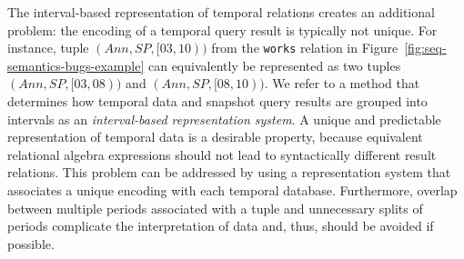 The interval-based representation of temporal relations creates an
additional problem: the encoding of a temporal query result is
typically not unique.  For instance, tuple
$(\mathit{Ann},\mathit{SP},[03,10))$ from the \texttt{works} relation
in Figure~\ref{fig:seq-semantics-bugs-example} can equivalently be
represented as two tuples $(\mathit{Ann},\mathit{SP},[03,08))$ and
$(\mathit{Ann},\mathit{SP},[08,10))$.  We refer to a method that
determines how temporal data and snapshot query results are grouped
into intervals as an \textit{interval-based representation system}.  A
unique and predictable representation of temporal data is a desirable
property, because %
equivalent relational algebra
expressions should not lead to syntactically different result relations.
This problem can be addressed by using a representation system that
associates a unique encoding with each temporal database.
Furthermore, overlap between multiple periods associated with a tuple
and unnecessary splits of periods complicate the interpretation of
data and, thus, should be avoided if possible.

